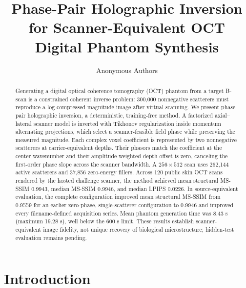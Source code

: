 \documentclass[runningheads]{llncs}
\newcommand{\method}{phase-pair holographic inversion}
\newcommand{\ms}{MS-SSIM}
\begin{document}
\title{Phase-Pair Holographic Inversion for Scanner-Equivalent OCT Digital Phantom Synthesis}

\author{Anonymous Authors}

\maketitle

\begin{abstract}
Generating a digital optical coherence tomography (OCT) phantom from a target
B-scan is a constrained coherent inverse problem: 300,000 nonnegative
scatterers must reproduce a log-compressed magnitude image after virtual
scanning. We present \method, a deterministic, training-free method. A
factorized axial--lateral scanner model is inverted with Tikhonov
regularization inside momentum alternating projections, which select a
scanner-feasible field phase while preserving the measured magnitude. Each
complex voxel coefficient is represented by two nonnegative scatterers at
carrier-equivalent depths. Their phasors match the coefficient at the center
wavenumber and their amplitude-weighted depth offset is zero, canceling the
first-order phase slope across the scanner bandwidth. A $256\!\times\!512$
scan uses 262,144 active scatterers and 37,856 zero-energy fillers. Across 120
public skin OCT scans rendered by the hosted challenge scanner, the method
achieved mean structural \ms{} 0.9943, median \ms{} 0.9946, and median LPIPS
0.0226. In source-equivalent evaluation, the complete configuration improved
mean structural \ms{} from 0.9559 for an earlier zero-phase,
single-scatterer configuration to 0.9946 and improved every filename-defined
acquisition series. Mean phantom generation time was 8.43 s (maximum 19.28 s),
well below the 600 s limit. These results establish scanner-equivalent image
fidelity, not unique recovery of biological microstructure; hidden-test
evaluation remains pending.

\end{abstract}

\section{Introduction}
\end{document}
